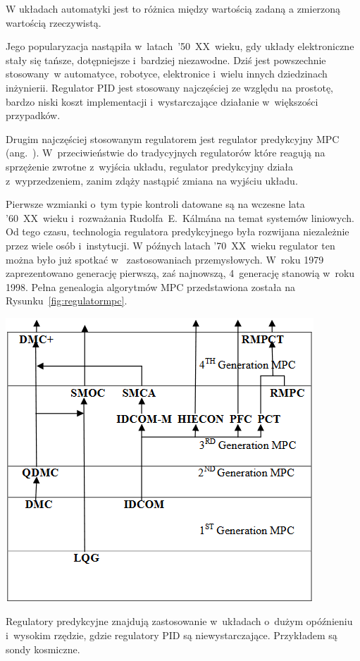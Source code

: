 \begin{Definition}\label{def:blad}
  W układach automatyki jest to różnica między wartością zadaną a zmierzoną wartością rzeczywistą.
\end{Definition}

Jego popularyzacja nastąpiła w~latach~'50~XX~wieku, gdy układy elektroniczne stały się tańsze, dotępniejsze i~bardziej niezawodne. Dziś jest powszechnie stosowany~w automatyce, robotyce, elektronice i~wielu innych dziedzinach inżynierii. Regulator PID jest stosowany najczęściej ze względu na prostotę, bardzo niski koszt implementacji i~wystarczające działanie w~większości przypadków.

Drugim najczęściej stosowanym regulatorem jest regulator predykcyjny MPC (ang.~). W~przeciwieństwie do tradycyjnych regulatorów które reagują na sprzężenie zwrotne z~wyjścia układu, regulator predykcyjny działa z~wyprzedzeniem, zanim zdąży nastąpić zmiana na wyjściu układu. 

Pierwsze wzmianki o~tym typie kontroli datowane są na wczesne lata '60~XX~wieku i~rozważania Rudolfa~E.~Kálmána na temat systemów liniowych. Od tego czasu, technologia regulatora predykcyjnego była rozwijana niezależnie przez wiele osób i~instytucji. W późnych latach '70~XX~wieku regulator ten można było już spotkać w ~zastosowaniach przemysłowych. W~roku 1979 zaprezentowano generację pierwszą, zaś najnowszą, 4~generację stanowią w~roku 1998\cite{bib:regulatormpc}. Pełna genealogia algorytmów MPC przedstawiona została na Rysunku~\ref{fig:regulatormpc}.

\begin{center}
  \includegraphics[scale=1]{images/drzewompc.png}
  \label{fig:regulatormpc}
\end{center}

Regulatory predykcyjne znajdują zastosowanie w~układach o~dużym opóźnieniu i~wysokim rzędzie, gdzie regulatory PID są niewystarczające. Przykładem są sondy kosmiczne.